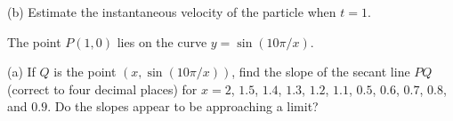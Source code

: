 \documentclass{sebase}
\begin{document}
\begin{multicols}{2}
\begin{ExerciseList}
\begin{ExerciseList}

%
%
%
%

%
%
%
%

\item[(b)] Estimate the instantaneous velocity of the particle when $t=1$.

%
\end{ExerciseList}

\item[{\hfill \protect\fbox{9.\hspace{-2pt}}}] The point $P\left( 1,0\right) $
lies on the curve $y=\sin \left( 10\pi /x\right) $.

\begin{ExerciseList}
\item[(a)] If $Q$ is the point $\left( x,\sin \left( 10\pi /x\right) \right) 
$, find the slope of the secant line $PQ$ (correct to four decimal places)
for \newline
$x=2$, $1.5$, $1.4$, $1.3$, $1.2$, $1.1$, $0.5$, $0.6$, $0.7$, $0.8$, and $%
0.9$. Do the slopes appear to be approaching a limit?\\[3pt]
%


\end{ExerciseList}
\end{ExerciseList}
\end{multicols}
\end{document}
